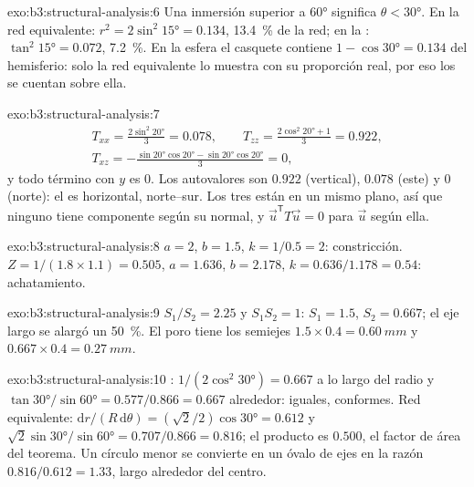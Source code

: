 \begin{solution}{exo:b3:structural-analysis:6}
Una inmersión superior a \ang{60} significa $\theta < \ang{30}$. En la red equivalente: $r^2 =
2\sin^2\ang{15} = 0.134$, \qty{13.4}{\percent} de la red; en la :
$\tan^2\ang{15} = 0.072$, \qty{7.2}{\percent}. En la esfera el casquete contiene
$1 - \cos\ang{30} = 0.134$ del hemisferio: solo la red equivalente lo muestra
con su proporción real, por eso los  se cuentan sobre ella.
\end{solution}

\begin{solution}{exo:b3:structural-analysis:7}
\begin{gather*}
  T_{xx} = \frac{2\sin^2\ang{20}}3 = 0.078,\qquad
  T_{zz} = \frac{2\cos^2\ang{20} + 1}3 = 0.922,\\
  T_{xz} = -\frac{\sin\ang{20}\cos\ang{20} - \sin\ang{20}\cos\ang{20}}3 = 0,
\end{gather*}
y todo término con $y$ es 0. Los autovalores son $0.922$ (vertical),
$0.078$ (este) y $0$ (norte): el  es horizontal, norte--sur.
Los tres  están en un mismo plano, así que ninguno tiene componente según
su normal, y $\vec u^{\mathsf T}T\vec u = 0$ para $\vec u$ según ella.
\end{solution}

\begin{solution}{exo:b3:structural-analysis:8}
$a = 2$, $b = 1.5$, $k = 1/0.5 = 2$: constricción. $Z = 1/(1.8\times1.1) =
0.505$, $a = 1.636$, $b = 2.178$, $k = 0.636/1.178 = 0.54$: achatamiento.
\end{solution}

\begin{solution}{exo:b3:structural-analysis:9}
$S_1/S_2 = 2.25$ y $S_1S_2 = 1$: $S_1 = 1.5$, $S_2 = 0.667$; el eje largo
se alargó un \qty{50}{\percent}. El poro tiene los semiejes $1.5\times0.4 =
\qty{0.60}{mm}$ y $0.667\times0.4 = \qty{0.27}{mm}$.
\end{solution}

\begin{solution}{exo:b3:structural-analysis:10}
\sloppy {}: $1/(2\cos^2\ang{30}) = 0.667$ a lo largo del radio y
$\tan\ang{30}/\sin\ang{60} = 0.577/0.866 = 0.667$ alrededor: iguales, conformes.
Red equivalente: $\mathrm dr/(R\,\mathrm d\theta) = (\sqrt2/2)\cos\ang{30} = 0.612$
y $\sqrt2\sin\ang{30}/\sin\ang{60} = 0.707/0.866 = 0.816$; el producto es
$0.500$, el factor de área del teorema. Un círculo menor se convierte en un óvalo
de ejes en la razón $0.816/0.612 = 1.33$, largo alrededor del centro.
\end{solution}

